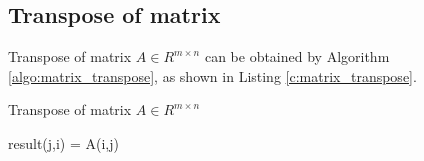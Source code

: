 

\subsection{Transpose of matrix}
Transpose of matrix $A \in {R^{m \times n}}$ can be obtained by Algorithm \ref{algo:matrix_transpose}, as shown in Listing \ref{c:matrix_transpose}.
\begin{algorithm}
	\caption{Transpose of matrix $A \in {R^{m \times n}}$}
	\label{algo:matrix_transpose}
	\begin{algorithmic}[1]
				\State result(j,i) = A(i,j)
			\EndFor
		\EndFor
	\end{algorithmic}
\end{algorithm}

